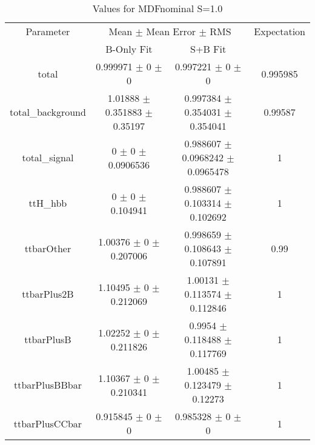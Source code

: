 \begin{table}
\centering
\caption{Values for MDFnominal S=1.0}
\begin{tabular}{cccc}
\toprule
Parameter & \multicolumn{2}{c}{Mean $\pm$ Mean Error $\pm$ RMS} & Expectation\\
 & B-Only Fit & S+B Fit & \\
\midrule
total & \num{0.999971} $\pm$ \num{0} $\pm$ \num{0} & \num{0.997221} $\pm$ \num{0} $\pm$ \num{0} & \num{0.995985}\\
total\_background & \num{1.01888} $\pm$ \num{0.351883} $\pm$ \num{0.35197} & \num{0.997384} $\pm$ \num{0.354031} $\pm$ \num{0.354041} & \num{0.99587}\\
total\_signal & \num{0} $\pm$ \num{0} $\pm$ \num{0.0906536} & \num{0.988607} $\pm$ \num{0.0968242} $\pm$ \num{0.0965478} & \num{1}\\
ttH\_hbb & \num{0} $\pm$ \num{0} $\pm$ \num{0.104941} & \num{0.988607} $\pm$ \num{0.103314} $\pm$ \num{0.102692} & \num{1}\\
ttbarOther & \num{1.00376} $\pm$ \num{0} $\pm$ \num{0.207006} & \num{0.998659} $\pm$ \num{0.108643} $\pm$ \num{0.107891} & \num{0.99}\\
ttbarPlus2B & \num{1.10495} $\pm$ \num{0} $\pm$ \num{0.212069} & \num{1.00131} $\pm$ \num{0.113574} $\pm$ \num{0.112846} & \num{1}\\
ttbarPlusB & \num{1.02252} $\pm$ \num{0} $\pm$ \num{0.211826} & \num{0.9954} $\pm$ \num{0.118488} $\pm$ \num{0.117769} & \num{1}\\
ttbarPlusBBbar & \num{1.10367} $\pm$ \num{0} $\pm$ \num{0.210341} & \num{1.00485} $\pm$ \num{0.123479} $\pm$ \num{0.12273} & \num{1}\\
ttbarPlusCCbar & \num{0.915845} $\pm$ \num{0} $\pm$ \num{0} & \num{0.985328} $\pm$ \num{0} $\pm$ \num{0} & \num{1}\\
\bottomrule
\end{tabular}
\end{table}